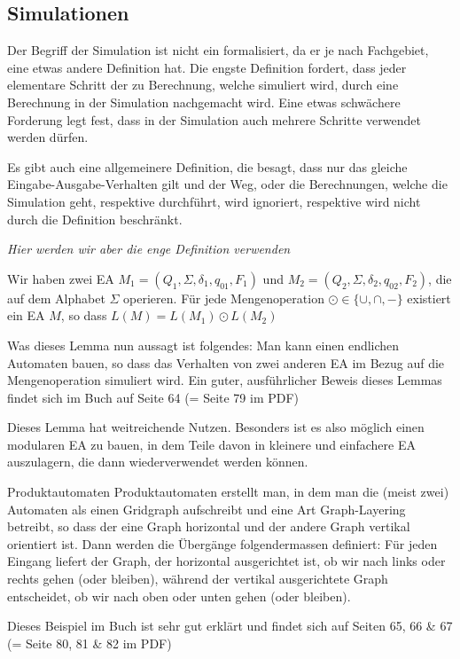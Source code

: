 \subsection{Simulationen}
Der Begriff der Simulation ist nicht ein formalisiert, da er je nach Fachgebiet, eine etwas andere Definition hat.
Die engste Definition fordert, dass jeder elementare Schritt der zu Berechnung, welche simuliert wird, durch eine Berechnung in der Simulation nachgemacht wird.
Eine etwas schwächere Forderung legt fest, dass in der Simulation auch mehrere Schritte verwendet werden dürfen.

Es gibt auch eine allgemeinere Definition, die besagt, dass nur das gleiche Eingabe-Ausgabe-Verhalten gilt und der Weg, oder die Berechnungen, welche die Simulation geht, respektive durchführt, wird ignoriert, respektive wird nicht durch die Definition beschränkt.

\textit{Hier werden wir aber die enge Definition verwenden}

 Wir haben zwei EA $M_1 = (Q_1, \Sigma, \delta_1, q_{01}, F_1)$ und $M_2 = (Q_2, \Sigma, \delta_2, q_{02}, F_2)$, die auf dem Alphabet $\Sigma$ operieren.
Für jede Mengenoperation $\odot \in \{ \cup, \cap, - \}$ existiert ein EA $M$, so dass $L(M) = L(M_1) \odot L(M_2)$

Was dieses Lemma nun aussagt ist folgendes: Man kann einen endlichen Automaten bauen, so dass das Verhalten von zwei anderen EA im Bezug auf die Mengenoperation simuliert wird.
Ein guter, ausführlicher Beweis dieses Lemmas findet sich im Buch auf Seite 64 (= Seite 79 im PDF)

Dieses Lemma hat weitreichende Nutzen. 
Besonders ist es also möglich einen modularen EA zu bauen, in dem Teile davon in kleinere und einfachere EA auszulagern, die dann wiederverwendet werden können.

\begin{intuition}[]{Produktautomaten}
    Produktautomaten erstellt man, in dem man die (meist zwei) Automaten als einen Gridgraph aufschreibt und eine Art Graph-Layering betreibt,
    so dass der eine Graph horizontal und der andere Graph vertikal orientiert ist.
    Dann werden die Übergänge folgendermassen definiert:
    Für jeden Eingang liefert der Graph, der horizontal ausgerichtet ist, ob wir nach links oder rechts gehen (oder bleiben),
    während der vertikal ausgerichtete Graph entscheidet, ob wir nach oben oder unten gehen (oder bleiben).
\end{intuition}

\inlineex Dieses Beispiel im Buch ist sehr gut erklärt und findet sich auf Seiten 65, 66 \& 67 (= Seite 80, 81 \& 82 im PDF)
